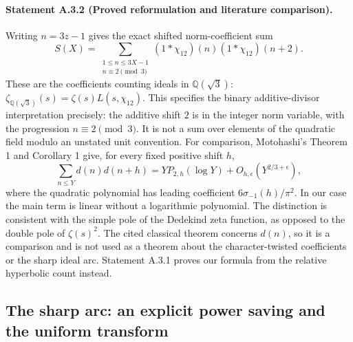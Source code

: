 \paragraph{Statement A.3.2 (Proved reformulation and literature comparison).}
Writing $n=3z-1$ gives the exact shifted norm-coefficient sum
\[
 S(X)=\sum_{\substack{1\leq n\leq3X-1\\n\equiv2\pmod3}}
       (1*\chi_{12})(n)(1*\chi_{12})(n+2).
\]
These are the coefficients counting ideals in $\mathbb Q(\sqrt3)$:
$\zeta_{\mathbb Q(\sqrt3)}(s)=\zeta(s)L(s,\chi_{12})$.
This specifies the binary additive-divisor interpretation precisely:
the additive shift $2$ is in the integer norm variable, with the
progression $n\equiv2\pmod3$. It is not a sum over elements of the
quadratic field modulo an unstated unit convention.
For comparison, Motohashi's Theorem 1 and Corollary 1
\cite{Motohashi1994} give, for every fixed positive shift $h$,
\[
 \sum_{n\leq Y}d(n)d(n+h)=Y P_{2,h}(\log Y)
       +O_{h,\epsilon}(Y^{2/3+\epsilon}),
\]
where the quadratic polynomial has leading coefficient
$6\sigma_{-1}(h)/\pi^2$. In our case the main term is linear without a
logarithmic polynomial. The distinction is consistent with the simple
pole of the Dedekind zeta function, as opposed to the double pole of
$\zeta(s)^2$. The cited classical theorem concerns $d(n)$, so it is a
comparison and is not used as a theorem about the character-twisted
coefficients or the sharp ideal arc. Statement A.3.1 proves our formula
from the relative hyperbolic count instead.

\subsection{The sharp arc: an explicit power saving and the uniform transform}
